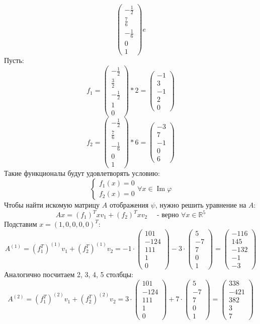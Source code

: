 \documentclass[a4paper]{article}
\newcommand{\mat}[1]{\begin{pmatrix} #1 \end{pmatrix}}
\renewcommand{\f}[2]{\frac{#1}{#2}}
\newcommand{\case}[1]{\begin{cases} #1 \end{cases}}
\renewcommand{\phi}{\varphi}
\newcommand{\RR}{\mathbb{R}}
\renewcommand{\Im}{\operatorname{Im}}
\begin{document}
\begin{enumerate}
$$    \mat{-\f{1}{2}\\\f{7}{6}\\-\f{1}{6}\\0\\1}e$$
    Пусть:
    $$f_1 = \mat{-\f{1}{2}\\\f{3}{2}\\-\f{1}{2}\\1\\0}*2 = \mat{-1\\3\\-1\\2\\0}$$
    $$f_2 = \mat{-\f{1}{2}\\\f{7}{6}\\-\f{1}{6}\\0\\1}*6 = \mat{-3\\7\\-1\\0\\6}$$
    Такие функционалы будут удовлетворять условию:
    $$\case{f_1(x) = 0\\ f_2(x) =0} \forall x \in \Im \phi$$
    Чтобы найти искомую матрицу $A$ отображения $\psi$, нужно решить уравнение на $A$:
    $$Ax = (f_1)^T x v_1 + (f_2)^T x v_2 \quad \text{ - верно $\forall x \in \RR^5$}$$
    Подставим $x = (1, 0, 0, 0, 0)^T$:
    $$A^{(1)} = (f_1^T)^{(1)} v_1 + (f_2^T)^{(1)} v_2 
    = -1\cdot \mat{101\\-124\\111\\1\\0}-3\cdot \mat{5\\-7\\7\\0\\1}=
    \mat{ -116 \\ 145 \\ -132 \\ -1 \\ -3}$$
    Аналогично посчитаем 2, 3, 4, 5 столбцы:
    $$A^{(2)} = (f_1^T)^{(2)} v_1 + (f_2^T)^{(2)} v_2 
    = 3\cdot \mat{101\\-124\\111\\1\\0}+7\cdot \mat{5\\-7\\7\\0\\1}=
    \mat{ 338 \\ -421 \\ 382 \\ 3 \\ 7}$$

\end{enumerate}
\end{document}
